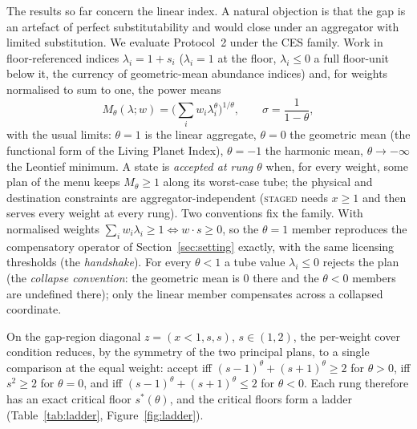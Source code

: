 \documentclass[preprint,11pt,authoryear]{elsarticle}
\theoremstyle{definition}
\theoremstyle{remark}
\newcommand{\act}[1]{\textsc{#1}}
\begin{document}
The results so far concern the linear index. A natural objection is that the gap is an artefact of perfect substitutability and would close under an aggregator with limited substitution. We evaluate Protocol~2 under the CES family. Work in floor-referenced indices $\lambda_i=1+s_i$ ($\lambda_i=1$ at the floor, $\lambda_i\le0$ a full floor-unit below it, the currency of geometric-mean abundance indices) and, for weights normalised to sum to one, the power means
\[
M_\theta(\lambda;w)=\Big(\sum_iw_i\lambda_i^\theta\Big)^{1/\theta},\qquad\sigma=\frac1{1-\theta},
\]
with the usual limits: $\theta=1$ is the linear aggregate, $\theta=0$ the geometric mean (the functional form of the Living Planet Index), $\theta=-1$ the harmonic mean, $\theta\to-\infty$ the Leontief minimum. A state is \emph{accepted at rung $\theta$} when, for every weight, some plan of the menu keeps $M_\theta\ge1$ along its worst-case tube; the physical and destination constraints are aggregator-independent (\act{staged} needs $x\ge1$ and then serves every weight at every rung). Two conventions fix the family. With normalised weights $\sum_iw_i\lambda_i\ge1\iff w\cdot s\ge0$, so the $\theta=1$ member reproduces the compensatory operator of Section~\ref{sec:setting} exactly, with the same licensing thresholds (the \emph{handshake}). For every $\theta<1$ a tube value $\lambda_i\le0$ rejects the plan (the \emph{collapse convention}: the geometric mean is $0$ there and the $\theta<0$ members are undefined there); only the linear member compensates across a collapsed coordinate.

On the gap-region diagonal $z=(x<1,s,s)$, $s\in(1,2)$, the per-weight cover condition reduces, by the symmetry of the two principal plans, to a single comparison at the equal weight: accept iff $(s-1)^\theta+(s+1)^\theta\ge2$ for $\theta>0$, iff $s^2\ge2$ for $\theta=0$, and iff $(s-1)^\theta+(s+1)^\theta\le2$ for $\theta<0$. Each rung therefore has an exact critical floor $s^*(\theta)$, and the critical floors form a ladder (Table~\ref{tab:ladder}, Figure~\ref{fig:ladder}).
\end{document}

